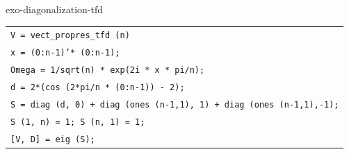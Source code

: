 \begin{correction}{exo-diagonalization-tfd}
\begin{listing} 
\begin{footnotesize}
{\upshape
\begin{tabular}{l} \texttt{\pfunction V = vect\_propres\_tfd (n)} \\
\texttt{x = (0:n-1)'* (0:n-1);} \\
\texttt{Omega = 1/sqrt(n) * exp(2i * x * pi/n);} \\
\texttt{d = 2*(cos (2*pi/n * (0:n-1)) - 2);} \\
\texttt{S = diag (d, 0) + diag (ones (n-1,1), 1) + diag (ones (n-1,1),-1);} \\
\texttt{S (1, n) = 1; S (n, 1) = 1;} \\
\texttt{[V, D] = eig (S);} \\
\end{tabular}
} 
\end{footnotesize}
\caption{Procedure \texttt{\upshape vect\_propres\_tfd}}
\label{listing-vectproprestfd}
\end{listing}
\end{correction}


